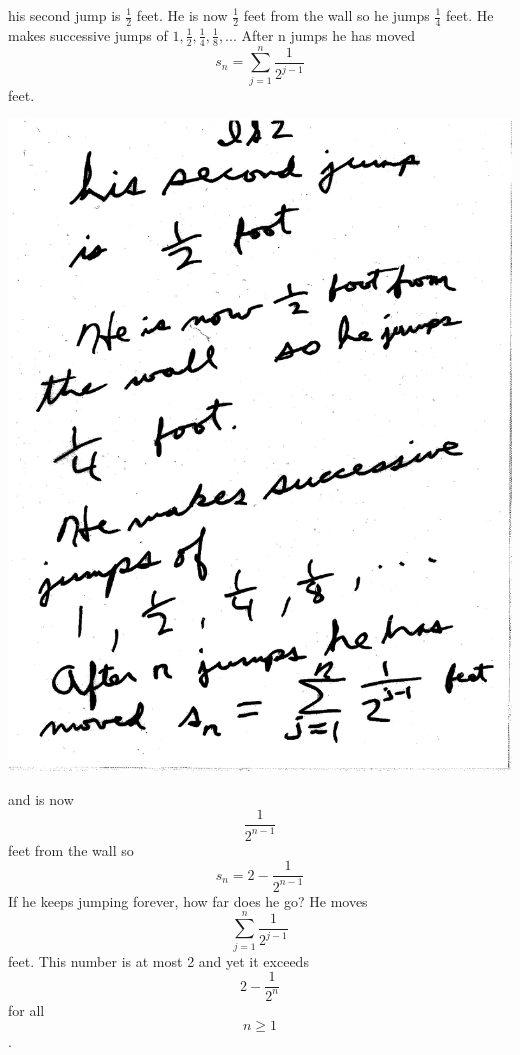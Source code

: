 \documentclass[10pt,a4paper]{article}
\begin{document}
\newpage

his second jump is ${\frac{1}{2}}$ feet. He is now ${\frac{1}{2}}$ feet from the wall so he jumps ${\frac{1}{4}}$ feet. He makes successive jumps of ${1, \frac{1}{2}, \frac{1}{4}, \frac{1}{8}, . . .}$ After n jumps he has moved $$s_{n}=\sum_{j=1}^{n} {\frac{1}{2^{j-1}}}$$ feet. 

\includegraphics[scale=.5]{Pages/IS_2}

\newpage

and is now $${\frac{1}{2^{n-1}}}$$ feet from the wall so $${s_{n}=2-{\frac{1}{2^{n-1}}}}$$ If he keeps jumping forever, how far does he go? He moves $$\sum_{j=1}^{n} {\frac{1}{2^{j-1}}}$$ feet. This number is at most 2 and yet it exceeds $$2-{\frac{1}{2^{n}}}$$ for all $$n\geq1$$. 
\end{document}
